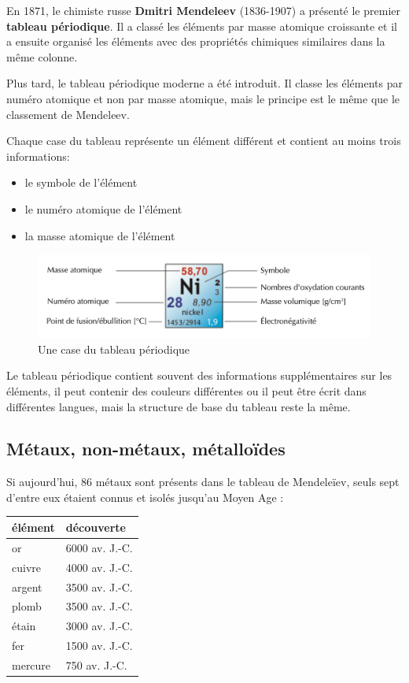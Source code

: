 \documentclass[
  11pt,
  a4paper,
  openany]{book}
\providecommand{\tightlist}{%
  \setlength{\itemsep}{0pt}\setlength{\parskip}{0pt}}
\begin{document}
En 1871, le chimiste russe \textbf{Dmitri Mendeleev} (1836-1907) a présenté le premier \textbf{tableau périodique}. Il a classé les éléments par masse atomique croissante et il a ensuite organisé les éléments avec des propriétés chimiques similaires dans la même colonne.

Plus tard, le tableau périodique moderne a été introduit. Il classe les éléments par numéro atomique et non par masse atomique, mais le principe est le même que le classement de Mendeleev.

\clearpage

Chaque case du tableau représente un élément différent et contient au moins trois informations:

\begin{itemize}
\tightlist
\item
  le symbole de l'élément
\item
  le numéro atomique de l'élément
\item
  la masse atomique de l'élément
\end{itemize}

\begin{figure}

{\centering \includegraphics[width=0.67\linewidth]{images/tpe-case} 

}

\caption{Une case du tableau périodique}\label{fig:tpe-case}
\end{figure}

Le tableau périodique contient souvent des informations supplémentaires sur les éléments, il peut contenir des couleurs différentes ou il peut être écrit dans différentes langues, mais la structure de base du tableau reste la même.

\subsection{Métaux, non-métaux, métalloïdes}\label{muxe9taux-non-muxe9taux-muxe9tallouxefdes}

Si aujourd'hui, 86 métaux sont présents dans le tableau de Mendeleïev, seuls sept d'entre eux étaient connus et isolés jusqu'au Moyen Age :

\begin{longtable}[]{@{}ll@{}}
\toprule\noalign{}
élément & découverte \\
\midrule\noalign{}
\endhead
\bottomrule\noalign{}
\endlastfoot
or & 6000 av. J.-C. \\
cuivre & 4000 av. J.-C. \\
argent & 3500 av. J.-C. \\
plomb & 3500 av. J.-C. \\
étain & 3000 av. J.-C. \\
fer & 1500 av. J.-C. \\
mercure & 750 av. J.-C. \\
\end{longtable}
\end{document}
